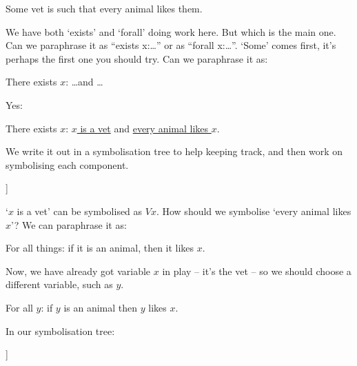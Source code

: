 \begin{samplesent}
	\item Some vet is such that every animal likes them. 
\end{samplesent}
We have both `exists' and `forall' doing work here. But which is the main one. Can we paraphrase it as ``exists x:\ldots'' or as ``forall x:\ldots''. `Some' comes first, it's perhaps the first one you should try. 
Can we paraphrase it as:
\begin{samplesent}
	\item[] There exists $x$: \ldots and \ldots
\end{samplesent}
Yes:
\begin{samplesent}
	\item[] There exists $x$: \underline{$x$ is a vet} and \underline{every animal likes $x$}.
\end{samplesent}
We write it out in a symbolisation tree to help keeping track, and then work on symbolising each component. 
\begin{center}
	\begin{forest}
		[Some vet is such that every animal likes them.  \\
		There exists $x$:   \ldots and \ldots\\
		$\exists x(\ldots\eand \ldots)$
		[$x$ is a vet\\$Vx$]
		[every animal likes $x$\\?]
		]
	\end{forest}
\end{center}
`$x$ is a vet' can be symbolised as $Vx$. How should we symbolise `every animal likes $x$'? 
We can paraphrase it as:
\begin{samplesent}
	\item[] For all things: if it is an animal, then it likes $x$.
\end{samplesent}
Now, we have already got variable $x$ in play -- it's the vet -- so we should choose a different variable, such as $y$. 
\begin{samplesent}
	\item[] For all $y$: if $y$ is an animal then $y$ likes $x$.
\end{samplesent}
In our symbolisation tree:
\begin{center}
	\begin{forest}
		[every animal likes $x$\\{For all $y$, if \ldots then \ldots}\\$\forall y(\ldots\eif\ldots)$
		[$y$ is an animal\\$Ay$]
		[$x$ likes $y$\\$Lyx$]
		]
	\end{forest}
\end{center}
